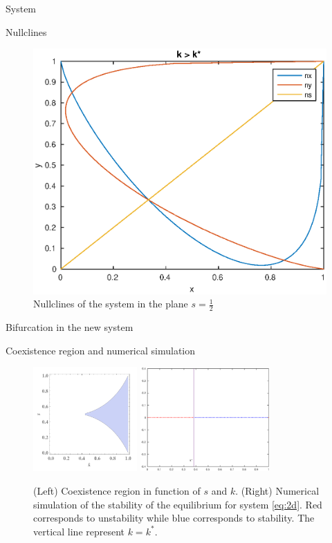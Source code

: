 \documentclass[10pt]{beamer}
\begin{document}
\begin{frame}{System}
\begin{exampleblock}{Nullclines}
\begin{figure}[H]
\includegraphics[scale=0.2]{nullpg.eps}
\caption{Nullclines of the system in the plane $s=\frac{1}{2}$}
\label{fig:nullclines}
\end{figure}
\end{exampleblock}
\end{frame}

\begin{frame}{Bifurcation in the new system}

\begin{alertblock}{Coexistence region and numerical simulation}
\begin{figure}[H]
\centering
\includegraphics[height=4cm]{coexistence.png}
\includegraphics[height=4cm]{bifur.eps}
\caption{(Left) Coexistence region in function of $s$ and $k$. (Right) Numerical simulation of the stability of the equilibrium for system \ref{eq:2d}. Red corresponds to unstability while blue corresponds to stability. The vertical line represent $k=k^{\ast}$.}
\label{fig:coexistence}
\end{figure}

\end{alertblock}

\end{frame}
\end{document}
